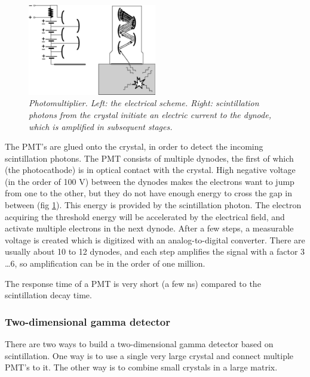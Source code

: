 \documentclass[11pt,oneside]{article}
\begin{document}
\begin{figure}[tb]
\centering
\includegraphics[width=0.5\textwidth]{figs/fig_jnpmt.pdf}
\caption{\label{fig:jnpmt} \emph{Photomultiplier. Left: the electrical scheme.
Right: scintillation photons from the crystal initiate an electric current to
the dynode, which is amplified in subsequent stages.}}
\end{figure}

The PMT's are glued onto the crystal, in order to detect the incoming
scintillation photons. The PMT consists of multiple dynodes, the first of
which (the photocathode) is in optical contact with the crystal. High negative
voltage (in the order of 100 V) between the dynodes makes the electrons want
to jump from one to the other, but they do not have enough energy to cross the
gap in between (fig \ref{fig:jnpmt}).  This energy is provided by the
scintillation photon. The electron acquiring the threshold energy will be
accelerated by the electrical field, and activate multiple electrons in the
next dynode. After a few steps, a measurable voltage is created which is
digitized with an analog-to-digital converter. There are usually about 10 to
12 dynodes, and each step amplifies the signal with a factor 3 \ldots 6, so
amplification can be in the order of one million.

The response time of a PMT is very short (a few ns) compared to the
scintillation decay time.


\subsubsection{Two-dimensional gamma detector}
%
There are two ways to build a two-dimensional gamma detector based on
scintillation. One way is to use a single very large crystal and connect
multiple PMT's to it. The other way is to combine small crystals in a
large matrix.
\end{document}
